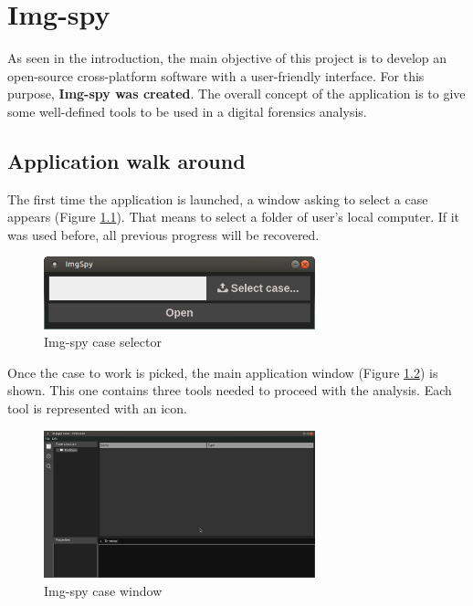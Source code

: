 \chapter{Img-spy}
\label{S:img-spy}

As seen in the introduction, the main objective of this project is to develop
an open-source cross-platform software with a user-friendly interface. For this
purpose, \textbf{Img-spy was created}. The overall concept of the application
is to give some well-defined tools to be used in a digital forensics analysis. 

\section{Application walk around}

The first time the application is launched, a window asking to select a case
appears (Figure \ref{F:img-spy-select-case}). That means to select a folder of
user's local computer. If it was used before, all previous progress will be 
recovered.

\begin{figure}[htb]
	\begin{center}
		\includegraphics[width=0.7\textwidth]{./figures/img-spy-select-case.png}
		\caption{Img-spy case selector}
		\label{F:img-spy-select-case}
	\end{center}
\end{figure}

Once the case to work is picked, the main application window (Figure
\ref{F:img-spy-case-window}) is shown. This one contains three tools needed to
proceed with the analysis. Each tool is represented with an icon.

\begin{figure}[htb]
	\begin{center}
		\includegraphics[width=0.7\textwidth]{./figures/img-spy-dark.png}
		\caption{Img-spy case window}
		\label{F:img-spy-case-window}
	\end{center}
\end{figure}


